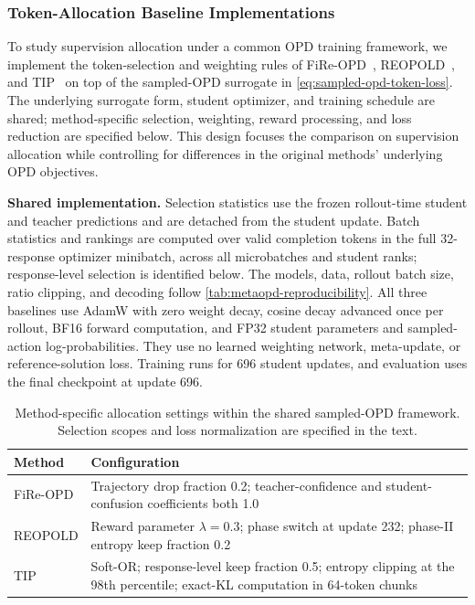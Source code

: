 \documentclass{article}
\theoremstyle{plain}
\theoremstyle{definition}
\theoremstyle{remark}
\begin{document}
\subsubsection{Token-Allocation Baseline Implementations}
\label{app:token-allocation-baselines}

To study supervision allocation under a common OPD training framework, we implement the token-selection and weighting rules of FiRe-OPD~\citep{li2026filter}, REOPOLD~\citep{ko2026scaling}, and TIP~\citep{xu2026tip} on top of the sampled-OPD surrogate in \cref{eq:sampled-opd-token-loss}. The underlying surrogate form, student optimizer, and training schedule are shared; method-specific selection, weighting, reward processing, and loss reduction are specified below. This design focuses the comparison on supervision allocation while controlling for differences in the original methods' underlying OPD objectives.

\textbf{Shared implementation.}
Selection statistics use the frozen rollout-time student and teacher predictions and are detached from the student update. Batch statistics and rankings are computed over valid completion tokens in the full 32-response optimizer minibatch, across all microbatches and student ranks; response-level selection is identified below. The models, data, rollout batch size, ratio clipping, and decoding follow \cref{tab:metaopd-reproducibility}. All three baselines use AdamW with zero weight decay, cosine decay advanced once per rollout, BF16 forward computation, and FP32 student parameters and sampled-action log-probabilities. They use no learned weighting network, meta-update, or reference-solution loss. Training runs for 696 student updates, and evaluation uses the final checkpoint at update 696.

\begin{table}[htbp]
\centering
\small
\setlength{\tabcolsep}{6pt}
\renewcommand{\arraystretch}{1.12}
\caption{Method-specific allocation settings within the shared sampled-OPD framework. Selection scopes and loss normalization are specified in the text.}
\label{tab:token-allocation-baseline-settings}
\begin{tabular}{@{}p{}p{}@{}}
\toprule
Method & Configuration \\
\midrule
FiRe-OPD & Trajectory drop fraction 0.2; teacher-confidence and student-confusion coefficients both 1.0 \\
REOPOLD & Reward parameter \(\lambda=0.3\); phase switch at update 232; phase-II entropy keep fraction 0.2 \\
TIP & Soft-OR; response-level keep fraction 0.5; entropy clipping at the 98th percentile; exact-KL computation in 64-token chunks \\
\bottomrule
\end{tabular}
\end{table}
\end{document}
